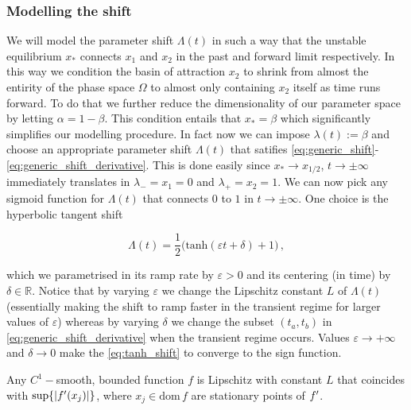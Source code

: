 \documentclass[../main.tex]{subfiles}
\begin{document}
\subsubsection{Modelling the shift}\label{subsubsec:modelling}

We will model the parameter shift $\Lambda(t)$ in such a way that the unstable equilibrium $x_{*}$ connects $x_{1}$ and $x_{2}$ in the past and forward limit respectively.
In this way we condition the basin of attraction $x_{2}$ to shrink from almost the entirity of the phase space $\Omega$ to almost only containing $x_{2}$ itself as time runs forward.
To do that we further reduce the dimensionality of our parameter space by letting $\alpha=1-\beta$.
This condition entails that $x_{*}=\beta$ which significantly simplifies our modelling procedure.
In fact now we can impose $\lambda(t):=\beta$ and choose an appropriate parameter shift $\Lambda(t)$ that satifies \eqref{eq:generic_shift}-\eqref{eq:generic_shift_derivative}.
This is done easily since $x_{*}\to x_{1/2}$, $t\to\pm\infty$ immediately translates in $\lambda_{-}=x_{1}=0$ and $\lambda_{+}=x_{2}=1$.
We can now pick any sigmoid function for $\Lambda(t)$ that connects $0$ to $1$ in $t\to\pm\infty$.
One choice is the hyperbolic tangent shift 

\begin{equation}\label{eq:tanh_shift}
     \Lambda(t) = \frac{1}{2}\big(\text{tanh}(\varepsilon t + \delta) + 1\big)\,, 
\end{equation}

which we parametrised in its ramp rate by $\varepsilon>0$ and its centering (in time) by $\delta\in \mathbb{R}$. 
Notice that by varying $\varepsilon$ we change the Lipschitz constant $L$ of $\Lambda(t)$ (essentially making the shift to ramp faster in the transient regime for larger values of $\varepsilon$) whereas by varying $\delta$ we change the subset $(t_{a}, t_{b})$ in \eqref{eq:generic_shift_derivative} when the transient regime occurs. 
Values $\varepsilon\to+\infty$ and $\delta\to0$ make the \eqref{eq:tanh_shift} to converge to the sign function. 

\begin{remark*}
     Any $C^{1}-$smooth, bounded function $f$ is Lipschitz with constant $L$ that coincides with $\sup\{|f'(x_{j})|\}$, where $x_{j}\in\text{dom}\,f$ are stationary points of $f'$.
\end{remark*}
\end{document}
